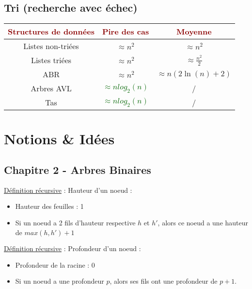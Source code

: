 \documentclass{article}
\newcommand{\dred}[1]{\textcolor{darkred}{\textbf{#1}}}
\newcommand{\gre}[1]{\textcolor{darkgreen}{#1}}
\begin{document}
\subsection{Tri (recherche avec échec)}

\begin{tabular}{|*{3}{c|}}
	\hline
	\dred{Structures de données} & \dred{Pire des cas} & \dred{Moyenne} \\
	\hline
	Listes non-triées  & $\approx n^2$ & $\approx n^2$ \\
	\hline
	Listes triées  & $\approx n^2$ & $\approx \frac{n^2}{2}$\\
	\hline
	ABR & $\approx n^2$ & $\approx n(2\ln{(n)}+2)$ \\
	\hline
	Arbres AVL & \gre{$\approx nlog_2{(n)}$} & /\\
	\hline
	Tas & \gre{$\approx nlog_2{(n)}$} & /\\
	\hline
\end{tabular}

\section{Notions \& Idées}

\subsection{Chapitre 2 - Arbres Binaires}

\noindent\underline{Définition récursive} : Hauteur d'un noeud :
\begin{itemize}
\item Hauteur des feuilles : 1
\item Si un noeud a 2 fils d'hauteur respective $h$ et $h'$, alors ce noeud a une hauteur de $max(h,h')+1$ \\
\end{itemize}

\noindent\underline{Définition récursive} : Profondeur d'un noeud :
\begin{itemize}
\item Profondeur de la racine : 0
\item Si un noeud a une profondeur $p$, alors ses fils ont une profondeur de $p+1$. \\
\end{itemize}
\end{document}
